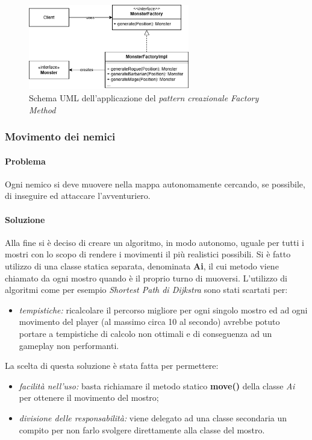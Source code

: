 \documentclass{report}
\begin{document}
\begin{figure}[H]
    \centering
    \includegraphics[width=7cm]{FactoryMethod.png}
    \caption{Schema UML dell'applicazione del \textit{pattern creazionale Factory Method}}
\end{figure}

\subsubsection{Movimento dei nemici}

\paragraph{Problema} Ogni nemico si deve muovere nella mappa autonomamente cercando, se possibile, di inseguire ed attaccare l'avventuriero.

\paragraph{Soluzione} Alla fine si è deciso di creare un algoritmo, in modo autonomo, uguale per tutti i mostri con lo scopo di rendere i movimenti il più realistici possibili. Si è fatto 
%
utilizzo di una classe statica separata, denominata \textbf{Ai}, il cui metodo viene chiamato da ogni mostro quando è il proprio turno di muoversi. L'utilizzo di algoritmi come per esempio
%
\textit{Shortest Path di Dijkstra} sono stati scartati per:

\begin{itemize}
    \item \textit{tempistiche:} ricalcolare il percorso migliore per ogni singolo mostro ed ad ogni movimento del player (al massimo circa 10 al secondo) avrebbe potuto portare a tempistiche di calcolo
%
non ottimali e di conseguenza ad un gameplay non performanti.
\end{itemize}

%
La scelta di questa soluzione è stata fatta per permettere:

\begin{itemize}
    \item \textit{facilità nell'uso:} basta richiamare il metodo statico \textbf{move()} della classe \textit{Ai} per ottenere il movimento del mostro;
    \item \textit{divisione delle responsabilità:} viene delegato ad una classe secondaria un compito per non farlo svolgere direttamente alla classe del mostro.
\end{itemize}
\end{document}
